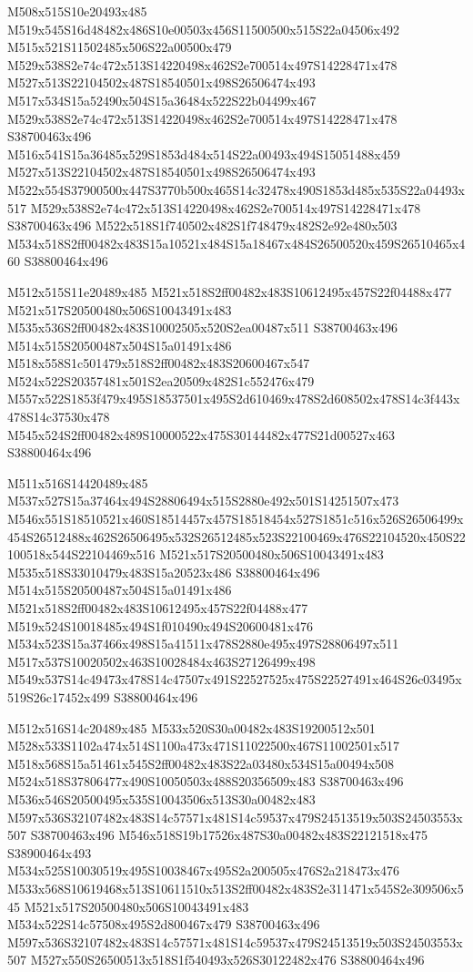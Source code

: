 \documentclass{article}
\begin{document}
\begin{multicols}{2}
M508x515S10e20493x485 M519x545S16d48482x486S10e00503x456S11500500x515S22a04506x492 M515x521S11502485x506S22a00500x479 M529x538S2e74c472x513S14220498x462S2e700514x497S14228471x478 M527x513S22104502x487S18540501x498S26506474x493 M517x534S15a52490x504S15a36484x522S22b04499x467 M529x538S2e74c472x513S14220498x462S2e700514x497S14228471x478 S38700463x496 M516x541S15a36485x529S1853d484x514S22a00493x494S15051488x459 M527x513S22104502x487S18540501x498S26506474x493 M522x554S37900500x447S3770b500x465S14c32478x490S1853d485x535S22a04493x517 M529x538S2e74c472x513S14220498x462S2e700514x497S14228471x478 S38700463x496 M522x518S1f740502x482S1f748479x482S2e92e480x503 M534x518S2ff00482x483S15a10521x484S15a18467x484S26500520x459S26510465x460 S38800464x496

M512x515S11e20489x485 M521x518S2ff00482x483S10612495x457S22f04488x477 M521x517S20500480x506S10043491x483 M535x536S2ff00482x483S10002505x520S2ea00487x511 S38700463x496 M514x515S20500487x504S15a01491x486 M518x558S1c501479x518S2ff00482x483S20600467x547 M524x522S20357481x501S2ea20509x482S1c552476x479 M557x522S1853f479x495S18537501x495S2d610469x478S2d608502x478S14c3f443x478S14c37530x478 M545x524S2ff00482x489S10000522x475S30144482x477S21d00527x463 S38800464x496

M511x516S14420489x485 M537x527S15a37464x494S28806494x515S2880e492x501S14251507x473 M546x551S18510521x460S18514457x457S18518454x527S1851c516x526S26506499x454S26512488x462S26506495x532S26512485x523S22100469x476S22104520x450S22100518x544S22104469x516 M521x517S20500480x506S10043491x483 M535x518S33010479x483S15a20523x486 S38800464x496 M514x515S20500487x504S15a01491x486 M521x518S2ff00482x483S10612495x457S22f04488x477 M519x524S10018485x494S1f010490x494S20600481x476 M534x523S15a37466x498S15a41511x478S2880e495x497S28806497x511 M517x537S10020502x463S10028484x463S27126499x498 M549x537S14c49473x478S14c47507x491S22527525x475S22527491x464S26c03495x519S26c17452x499 S38800464x496

M512x516S14c20489x485 M533x520S30a00482x483S19200512x501 M528x533S1102a474x514S1100a473x471S11022500x467S11002501x517 M518x568S15a51461x545S2ff00482x483S22a03480x534S15a00494x508 M524x518S37806477x490S10050503x488S20356509x483 S38700463x496 M536x546S20500495x535S10043506x513S30a00482x483 M597x536S32107482x483S14c57571x481S14c59537x479S24513519x503S24503553x507 S38700463x496 M546x518S19b17526x487S30a00482x483S22121518x475 S38900464x493 M534x525S10030519x495S10038467x495S2a200505x476S2a218473x476 M533x568S10619468x513S10611510x513S2ff00482x483S2e311471x545S2e309506x545 M521x517S20500480x506S10043491x483 M534x522S14c57508x495S2d800467x479 S38700463x496 M597x536S32107482x483S14c57571x481S14c59537x479S24513519x503S24503553x507 M527x550S26500513x518S1f540493x526S30122482x476 S38800464x496


\end{multicols}
\end{document}
